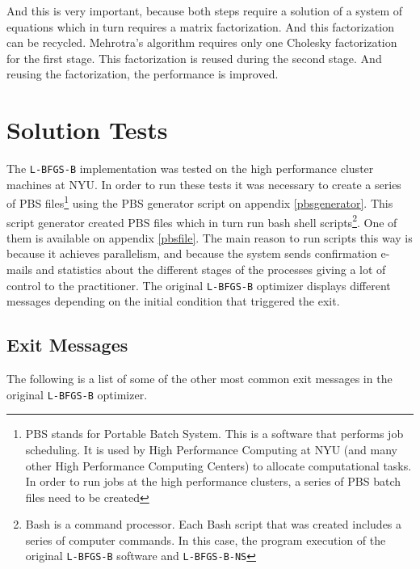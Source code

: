 And this is very important, because both steps require a solution of a system of equations which in turn requires a matrix factorization. And this factorization can be recycled. Mehrotra's algorithm requires only one Cholesky factorization for the first stage. This factorization is reused during the second stage. And reusing the factorization, the performance is improved.

\chapter{Solution Tests}

The \texttt{L-BFGS-B} implementation was tested on the high performance cluster machines at NYU. In order to run these tests it was necessary to create a series of PBS files\footnote{PBS stands for Portable Batch System. This is a software that performs job scheduling. It is used by High Performance Computing at NYU (and many other High Performance Computing Centers) to allocate computational tasks. In order to run jobs at the high performance clusters, a series of PBS batch files need to be created} using the PBS generator script on appendix \eqref{pbsgenerator}. This script generator created PBS files which in turn run bash shell scripts\footnote{Bash is a command processor. Each Bash script that was created includes a series of computer commands. In this case, the program execution of the original \texttt{L-BFGS-B} software and \texttt{L-BFGS-B-NS}}. One of them is available on appendix \eqref{pbsfile}. The main reason to run scripts this way is because it achieves parallelism, and because the system sends confirmation e-mails and statistics about the different stages of the processes giving a lot of control to the practitioner. The original \texttt{L-BFGS-B} optimizer displays different messages depending on the initial condition that triggered the exit.  

\section{Exit Messages}

The following is a list of some of the other most common exit messages in the original \texttt{L-BFGS-B} optimizer.

